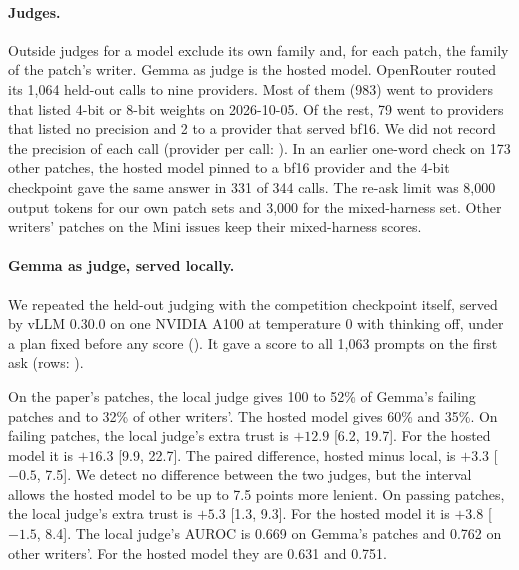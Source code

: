 \documentclass[10pt,letterpaper]{article}
\begin{document}
\paragraph{Judges.} Outside judges for a model exclude its own family and, for each patch, the family of the patch's %
writer. Gemma as judge is the hosted model. OpenRouter routed its 1,064 held-out calls to nine providers. Most of them
(983) went to providers that listed 4-bit or 8-bit weights on 2026-10-05. Of the rest, 79 went to providers that listed
no precision and 2 to a provider that served bf16. We did not record the precision of each call (provider per call: ).
In an earlier one-word check on 173 other patches, the hosted model pinned to a bf16 provider and the 4-bit checkpoint
gave the same answer in 331 of 344 calls. The re-ask limit was 8,000 output tokens for our own
patch sets and 3,000 for the mixed-harness set. Other writers' patches on the Mini issues keep their mixed-harness
scores.

\paragraph{Gemma as judge, served locally.} We repeated the held-out judging with the competition checkpoint itself,
served by vLLM 0.30.0 on one NVIDIA A100 at temperature 0 with thinking off, under a plan fixed before any score
(). It gave a score to all 1,063 prompts on the first ask (rows:
).

On the paper's patches, the local judge gives 100 to 52\% of Gemma's failing patches and to 32\% of other writers'. %
The hosted model gives 60\% and 35\%. On failing patches, the local judge's extra trust is $+12.9$
[6.2, 19.7]. For the hosted model it is $+16.3$ [9.9, 22.7]. The paired difference, hosted minus local, is $+3.3$
[$-0.5$, 7.5]. We detect no difference between the two judges, but the interval allows the hosted model to be up to
7.5 points more lenient. On passing patches, the local judge's extra trust is $+5.3$ [1.3, 9.3]. For the
hosted model it is $+3.8$ [$-1.5$, 8.4]. The local judge's AUROC is 0.669 on Gemma's patches and 0.762 on other
writers'. For the hosted model they are 0.631 and 0.751.
\end{document}

